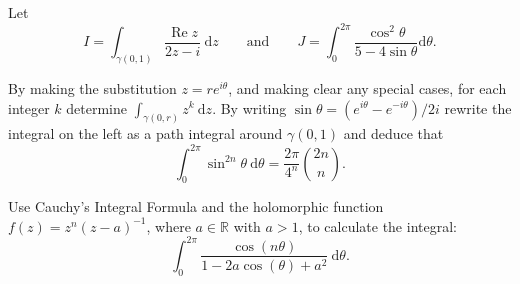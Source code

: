 \documentclass[answers]{exam}
\begin{document}
\begin{questions}



\question%
Let \[
	I=\int_{\gamma(0,1)} \frac{\operatorname{Re} z}{2 z-i} \mathrm{~d} z \qquad \text{and} \qquad J=\int_{0}^{2 \pi} \frac{\cos ^{2} \theta}{5-4 \sin \theta} \mathrm{d} \theta.
\]



\question%
By making the substitution $z=r e^{i \theta}$, and making clear any special cases, for each integer $k$ determine $\int_{\gamma(0, r)} z^{k} \mathrm{~d} z$. By writing $\sin \theta=\left(e^{i \theta}-e^{-i \theta}\right) / 2 i$ rewrite the integral on the left as a path integral around $\gamma(0,1)$ and deduce that \[
	\int_{0}^{2 \pi} \sin ^{2 n} \theta \mathrm{~d} \theta=\frac{2 \pi}{4^{n}}\binom{2 n}{n}.
\]



\question%
Use Cauchy's Integral Formula and the holomorphic function $f(z)=z^{n}(z-a)^{-1}$, where $a \in \mathbb{R}$ with $a>1$, to calculate the integral: \[
	\int_{0}^{2 \pi} \frac{\cos (n \theta)}{1-2 a \cos (\theta)+a^{2}} \mathrm{~d} \theta.
\]




\end{questions}
\end{document}
